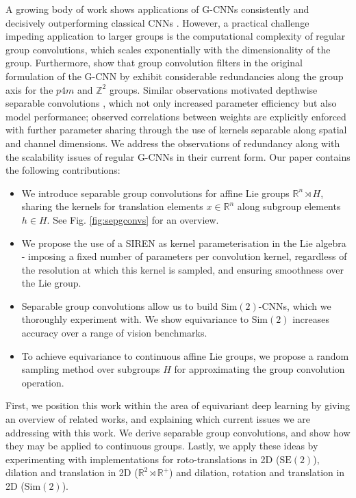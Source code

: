 \documentclass[nohyperref]{article}
\theoremstyle{plain}
\theoremstyle{definition}
\theoremstyle{remark}
\newcommand{\R}{\mathbb{R}}
\begin{document}
A growing body of work shows applications of G-CNNs consistently and decisively outperforming classical CNNs \citep{worrall2017harmonic, weiler20183d, bekkers2018roto, esteves2018learning, bekkers2019b, worrall2019deep, sosnovik2021scale}. However, a practical challenge impeding application to larger groups is the computational complexity of regular group convolutions, which scales exponentially with the dimensionality of the group.
Furthermore, \citet{lengyel2021exploiting} show that group convolution filters in the original formulation of the G-CNN by \citet{cohen2016group} exhibit considerable redundancies along the group axis for the $p4m$ and $\mathbb{Z}^2$ groups. Similar observations motivated depthwise separable convolutions \citep{chollet2017xception}, which not only increased parameter efficiency but also model performance; observed correlations between weights are explicitly enforced with further parameter sharing through the use of kernels separable along spatial and channel dimensions. We address the observations of redundancy along with the scalability issues of regular G-CNNs in their current form. Our paper contains the following contributions:
\begin{itemize}[topsep=0pt,itemsep=-1pt, leftmargin=0.5cm]
    \item We introduce separable group convolutions for affine Lie groups $\R^n \rtimes H$, sharing the kernels for translation elements $x \in \R^n$ along subgroup elements $h\in H$. See Fig. \ref{fig:sepgconvs} for an overview.
    \item We propose the use of a SIREN \citep{sitzmann2020implicit} as kernel parameterisation in the Lie algebra - imposing a fixed number of parameters per convolution kernel, regardless of the resolution at which this kernel is sampled, and ensuring smoothness over the Lie group.
    \item  Separable group convolutions allow us to build $\mathrm{Sim(2)}$-CNNs, which we thoroughly experiment with. We show equivariance to $\mathrm{Sim(2)}$ increases accuracy over a range of vision benchmarks.
    \item To achieve equivariance to continuous affine Lie groups, we propose a random sampling method over subgroups $H$ for approximating the group convolution operation.
\end{itemize}
First, we position this work within the area of equivariant deep learning by giving an overview of related works, and explaining which current issues we are addressing with this work.
We derive separable group convolutions, and show how they may be applied to continuous groups. Lastly, we apply these ideas by experimenting with implementations for roto-translations in 2D ($\mathrm{SE(2)}$), dilation and translation in 2D ($\R^2 \rtimes \R^+$) and dilation, rotation and translation in 2D ($\mathrm{Sim(2)}$). 
\end{document}
